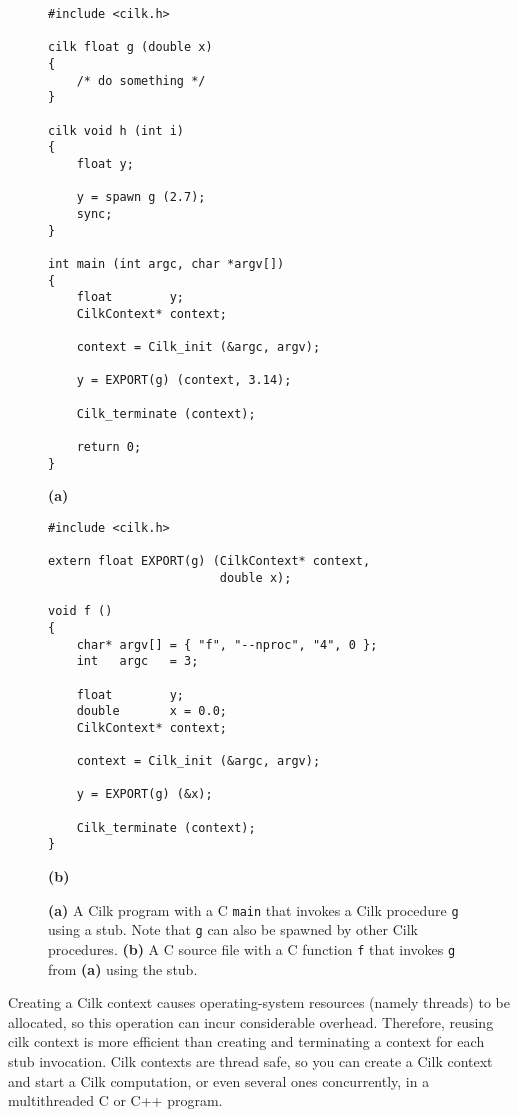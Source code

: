 \begin{figure}
\centering
\begin{minipage}{.45\textwidth}
\footnotesize
\begin{verbatim}
#include <cilk.h>

cilk float g (double x)
{ 
    /* do something */
}

cilk void h (int i)
{
    float y;

    y = spawn g (2.7);
    sync;
}

int main (int argc, char *argv[])
{
    float        y;
    CilkContext* context;

    context = Cilk_init (&argc, argv);

    y = EXPORT(g) (context, 3.14);

    Cilk_terminate (context);

    return 0;
}
\end{verbatim}
\centerline{\textbf{(a)}}
\end{minipage}\hspace{.05\textwidth}
\begin{minipage}{.4\textwidth}
\footnotesize
\begin{verbatim}
#include <cilk.h>

extern float EXPORT(g) (CilkContext* context, 
                        double x);

void f ()
{
    char* argv[] = { "f", "--nproc", "4", 0 };
    int   argc   = 3;

    float        y;
    double       x = 0.0;
    CilkContext* context;

    context = Cilk_init (&argc, argv);

    y = EXPORT(g) (&x);

    Cilk_terminate (context);
}
\end{verbatim}
\centerline{\textbf{(b)}}
\end{minipage}
\caption{\small \textbf{(a)} A Cilk program with a C \texttt{main} that
invokes a Cilk procedure \texttt{g} using a stub. Note that \texttt{g}
can also be spawned by other Cilk procedures.
\textbf{(b)} A C source file with a C function \texttt{f} that
invokes \texttt{g} from \textbf{(a)} using the stub.}
\label{fig:cilk-from-c}
\end{figure}

Creating a Cilk context causes operating-system resources (namely threads)
to be allocated, so this operation can incur considerable overhead. Therefore,
reusing cilk context is more efficient than creating and terminating a
context for each stub invocation. Cilk contexts are thread safe, so you
can create a Cilk context and start a Cilk computation, or even several
ones concurrently, in a multithreaded C or C++ program.

